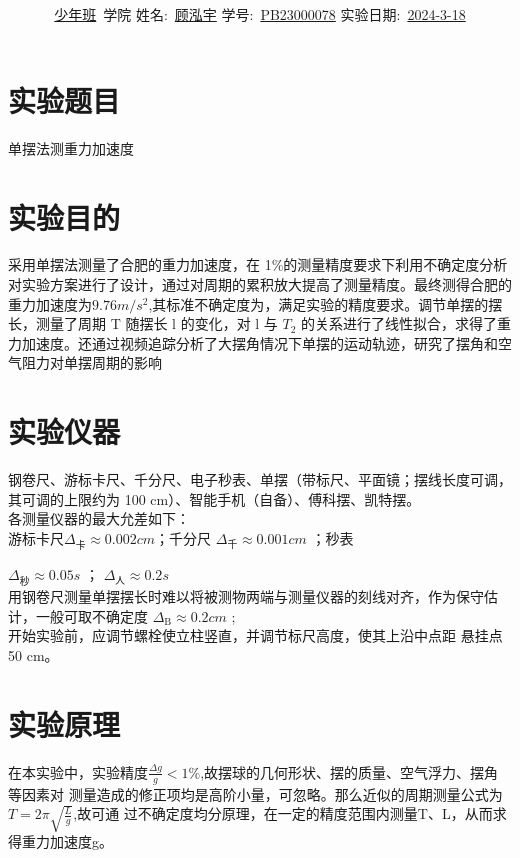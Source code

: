 \documentclass[12pt,a4paper]{article}
\title{\Huge{\textbf{\uuline{实\ 验\ 报\ 告}}}}
\author{\uline{少年班}\ 学院 \quad 姓名:\ \uline{顾泓宇} \quad 学号:\ \uline{PB23000078} \quad 实验日期:\ \uline{2024-3-18} }
\date{}
\newcommand{\down}[2]
{
	$\Delta_{\text{#1}}\approx{#2}$
}
\begin{document}
	\maketitle
	
	\section{实验题目}
	单摆法测重力加速度
	
	\section{实验目的}
	采用单摆法测量了合肥的重力加速度，在 1\%的测量精度要求下利用不确定度分析对实验方案进行了设计，通过对周期的累积放大提高了测量精度。最终测得合肥的重力加速度为$9.76m/s^2$,其标准不确定度为$ $，满足实验的精度要求。调节单摆的摆长，测量了周期 T 随摆长 l 的变化，对 l 与 $T_{2}$ 的关系进行了线性拟合，求得了重力加速度。还通过视频追踪分析了大摆角情况下单摆的运动轨迹，研究了摆角和空气阻力对单摆周期的影响
	
	\section{实验仪器}
	钢卷尺、游标卡尺、千分尺、电子秒表、单摆（带标尺、平面镜；摆线长度可调，其可调的上限约为 100 cm）、智能手机（自备）、傅科摆、凯特摆。\\ 
	\hspace*{2em} 各测量仪器的最大允差如下：\\
	游标卡尺$\Delta_{\text{卡}}\approx0.002cm$；千分尺\down{千}{0.001cm}；秒表
	\down{秒}{0.05s}；\down{人}{0.2s}\\
	\hspace*{2em} 用钢卷尺测量单摆摆长时难以将被测物两端与测量仪器的刻线对齐，作为保守估计，一般可取不确定度\down{B}{0.2cm}; \\
	\hspace*{2em}
	开始实验前，应调节螺栓使立柱竖直，并调节标尺高度，使其上沿中点距
	悬挂点 50 cm。
	
	
	
	\section{实验原理}
	在本实验中，实验精度$\frac{\Delta g}{g}<1\%$,故摆球的几何形状、摆的质量、空气浮力、摆角等因素对
	测量造成的修正项均是高阶小量，可忽略。那么近似的周期测量公式为$T=2\pi\sqrt{\frac{L}{g}}$,故可通
	过不确定度均分原理，在一定的精度范围内测量T、L，从而求得重力加速度g。
	
\end{document}
